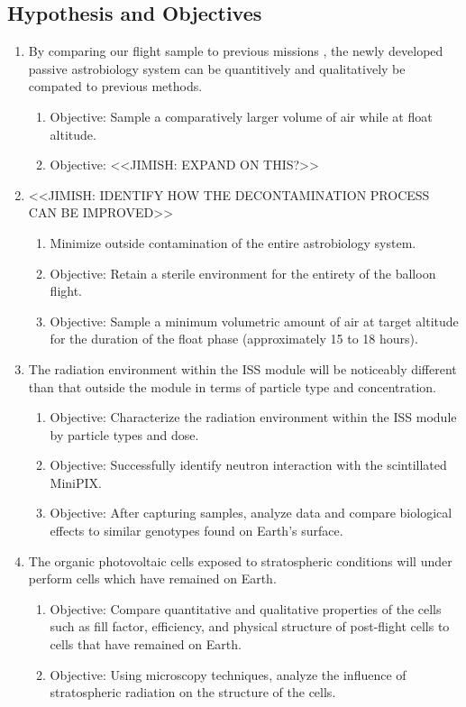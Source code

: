 \subsection{Hypothesis and Objectives}
\label{subsec:Hypothesis-Objectives}
\begin{enumerate}
\item By comparing our flight sample to previous missions \cite{SORA1}\cite{SORA2}, the newly developed passive astrobiology system can be quantitively and qualitatively be compated to previous methods.
  \begin{enumerate}
  \item Objective: Sample a comparatively larger volume of air while at float altitude.
  \item Objective: <<JIMISH: EXPAND ON THIS?>>
  \end{enumerate}
\item <<JIMISH: IDENTIFY HOW THE DECONTAMINATION PROCESS CAN BE IMPROVED>>
  \begin{enumerate}
  \item Minimize outside contamination of the entire astrobiology system.
  \item Objective: Retain a sterile environment for the entirety of the balloon flight.
  \item Objective: Sample a minimum volumetric amount of air at target altitude for the duration of the float phase (approximately 15 to 18 hours).
  \end{enumerate}
\item The radiation environment within the ISS module will be noticeably different than that outside the module in terms of particle type and concentration. 
  \begin{enumerate}
  \item Objective: Characterize the radiation environment within the ISS module by particle types and dose.
  \item Objective: Successfully identify neutron interaction with the scintillated MiniPIX.
  \item Objective: After capturing samples, analyze data and compare biological effects to similar genotypes found on Earth's surface.
  \end{enumerate}
\item The organic photovoltaic cells exposed to stratospheric conditions will under perform cells which have remained on Earth.
  \begin{enumerate}
  \item Objective: Compare quantitative and qualitative properties of the cells such as fill factor, efficiency, and physical structure of post-flight cells to cells that have remained on Earth.
  \item Objective: Using microscopy techniques, analyze the influence of stratospheric radiation on the structure of the cells.
  \end{enumerate}
\end{enumerate}
  
\vspace*{-0.5cm}